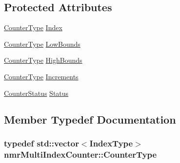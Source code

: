 \subsection*{Protected Attributes}
\begin{DoxyCompactItemize}
\item 
\hyperlink{classnmr_multi_index_counter_a6f7f42508ddcc24c957f012ffbcce57d}{Counter\+Type} \hyperlink{classnmr_multi_index_counter_a5598ea2e3618f8b799c4646f7b044e55}{Index}
\item 
\hyperlink{classnmr_multi_index_counter_a6f7f42508ddcc24c957f012ffbcce57d}{Counter\+Type} \hyperlink{classnmr_multi_index_counter_a7f1542632d9d98971b5a00056acc2d6e}{Low\+Bounds}
\item 
\hyperlink{classnmr_multi_index_counter_a6f7f42508ddcc24c957f012ffbcce57d}{Counter\+Type} \hyperlink{classnmr_multi_index_counter_ad0b3a6a43bc5c746d19bd56bcb112781}{High\+Bounds}
\item 
\hyperlink{classnmr_multi_index_counter_a6f7f42508ddcc24c957f012ffbcce57d}{Counter\+Type} \hyperlink{classnmr_multi_index_counter_aee8fabe67a3b2e5e30978e1b788cfa97}{Increments}
\item 
\hyperlink{classnmr_multi_index_counter_ad7beda3a3ee347140b4b5540770aeba5}{Counter\+Status} \hyperlink{classnmr_multi_index_counter_a0faa71921d5ef62d074493438e3f3e9c}{Status}
\end{DoxyCompactItemize}


\subsection{Member Typedef Documentation}
\hypertarget{classnmr_multi_index_counter_a6f7f42508ddcc24c957f012ffbcce57d}{}
\subsubsection[{Counter\+Type}]{\setlength{\rightskip}{0pt plus 5cm}typedef std\+::vector$<${\bf Index\+Type}$>$ {\bf nmr\+Multi\+Index\+Counter\+::\+Counter\+Type}\hspace{0.3cm}{\ttfamily [protected]}}\label{classnmr_multi_index_counter_a6f7f42508ddcc24c957f012ffbcce57d}
\hypertarget{classnmr_multi_index_counter_a0632b941a7d18df347174b4345d73d01}{}
